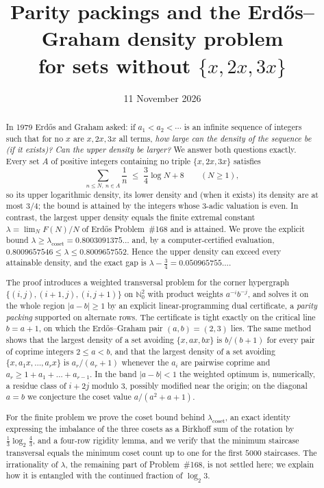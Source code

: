 \documentclass[11pt]{amsart}
\title[The Erd\H{o}s--Graham density problem for $\{x,2x,3x\}$]{Parity packings and the Erd\H{o}s--Graham density problem\\ for sets without $\{x,2x,3x\}$}
\date{11 November 2026}
\theoremstyle{definition}
\newcommand{\N}{\mathbb{N}}
\newcommand{\lamc}{\lambda_{\mathrm{coset}}}
\begin{document}
\begin{abstract}
In 1979 Erd\H{o}s and Graham asked: if $a_1<a_2<\cdots$ is an infinite sequence of integers such that for no $x$ are $x,2x,3x$ all terms, \emph{how large can the density of the sequence be (if it exists)? Can the upper density be larger?} We answer both questions exactly. Every set $A$ of positive integers containing no triple $\{x,2x,3x\}$ satisfies
\[
\sum_{n\le N,\ n\in A}\frac1n\;\le\;\frac34\log N+8\qquad(N\ge1),
\]
so its upper logarithmic density, its lower density and (when it exists) its density are at most $3/4$; the bound is attained by the integers whose $3$-adic valuation is even. In contrast, the largest upper density equals the finite extremal constant $\lambda=\lim_N F(N)/N$ of Erd\H{o}s Problem~\#168 and is attained. We prove the explicit bound $\lambda\ge \lamc=0.8003091375\ldots$ and, by a computer-certified evaluation, $0.8009657546\le\lambda\le0.8009657552$. Hence the upper density can exceed every attainable density, and the exact gap is $\lambda-\tfrac34=0.050965755\ldots$.

The proof introduces a weighted transversal problem for the corner hypergraph $\{(i,j),(i+1,j),(i,j+1)\}$ on $\N_0^2$ with product weights $a^{-i}b^{-j}$, and solves it on the whole region $|a-b|\ge1$ by an explicit linear-programming dual certificate, a \emph{parity packing} supported on alternate rows. The certificate is tight exactly on the critical line $b=a+1$, on which the Erd\H{o}s--Graham pair $(a,b)=(2,3)$ lies. The same method shows that the largest density of a set avoiding $\{x,ax,bx\}$ is $b/(b+1)$ for every pair of coprime integers $2\le a<b$, and that the largest density of a set avoiding $\{x,a_1x,\dots,a_rx\}$ is $a_r/(a_r+1)$ whenever the $a_i$ are pairwise coprime and $a_r\ge 1+a_1+\dots+a_{r-1}$. In the band $|a-b|<1$ the weighted optimum is, numerically, a residue class of $i+2j$ modulo $3$, possibly modified near the origin; on the diagonal $a=b$ we conjecture the coset value $a/(a^2+a+1)$.

For the finite problem we prove the coset bound behind $\lamc$, an exact identity expressing the imbalance of the three cosets as a Birkhoff sum of the rotation by $\tfrac13\log_2\tfrac43$, and a four-row rigidity lemma, and we verify that the minimum staircase transversal equals the minimum coset count up to one for the first $5000$ staircases. The irrationality of $\lambda$, the remaining part of Problem~\#168, is not settled here; we explain how it is entangled with the continued fraction of $\log_2 3$.
\end{abstract}
\end{document}
